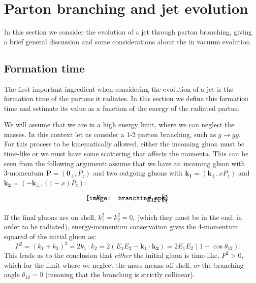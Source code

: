 \documentclass[a4paper,12pt]{article}
\numberwithin{equation}{section}
\begin{document}
\section{Parton branching and jet evolution}\label{general}

In this section we consider the evolution of a jet through parton branching, giving a brief general discussion and some considerations about the in vacuum evolution.

\subsection{Formation time}


The first important ingredient when considering the evolution of a jet is the formation time of the partons it radiates. In this section we define this formation time and estimate its value as a function of the energy of the radiated parton. 

We will assume that we are in a high energy limit, where we can neglect the masses. In this context let us consider a  1-2 parton branching, such as $g\rightarrow gg$.
For this process to be kinematically allowed, either the incoming gluon must be time-like or we must have some scattering that affects the momenta. This can be seen from the following argument: assume that we have an incoming gluon with 3-momentum $\mathbf{P}=(\mathbf{0_\perp},P_z)$ and two outgoing gluons with $\mathbf{k_1}=(\mathbf{k_\perp},xP_z)$ and $\mathbf{k_2}=(-\mathbf{k_\perp},(1-x)P_z)$:
\begin{equation}
\begin{gathered}
\begin{tikzpicture}
    \node[anchor=south west,inner sep=0] (image) at (0,0) {\texttt{[image: branching.eps]}};
    \begin{scope}[x={(image.south east)},y={(image.north west)}]
        \draw[] (0.70,0.35) arc (-20:20:0.5);
        \node[] at (0.15, 0.65) {$P$};
        \node[] at (0.95, 0.25) {$k_1$};
		\node[] at (0.95, 0.75) {$k_2$};
        \node[] at (0.8, 0.5) {$\theta_{12}$};
    \end{scope}
\end{tikzpicture}
\end{gathered}
\end{equation}
If the final gluons are on shell, $k_1^2=k_2^2=0$, (which they must be in the end, in order to be radiated), energy-momentum conservation gives the 4-momentum squared of the initial gluon as:
\begin{equation}
P^2=(k_1+k_2)^2=2 k_1 \cdot k_2=2(E_1E_2-\mathbf{k_1}\cdot\mathbf{k_2})=2E_1E_2(1-\cos\theta_{12}).
\end{equation}
This leads us to the conclusion that \emph{either} the initial gluon is time-like, $P^2>0$, which for the limit where we neglect the mass means off shell, \emph{or} the branching angle $\theta_{12}=0$ (meaning that the branching is strictly collinear).
\end{document}

